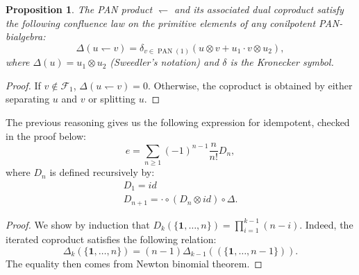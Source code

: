 \documentclass[11pt,leqno]{amsart}
\theoremstyle{definition}
\theoremstyle{plain}
\newtheorem{proposition}[definition]{Proposition}
\begin{document}
\begin{proposition}
The PAN product $\leftharpoondown$ and its associated dual coproduct satisfy the following confluence law on the primitive elements of any conilpotent PAN-bialgebra:
\begin{equation} \label{comprelPAN}
\Delta (u \leftharpoondown v) = \delta_{v \in \operatorname{PAN}(1)} \left(u \otimes v + u_1 \cdot v \otimes u_2 \right), 
\end{equation}
where $\Delta(u) = u_1 \otimes u_2$ (Sweedler's notation) and $\delta$ is the Kronecker symbol.
\begin{figure}[h!]
\end{figure}
\end{proposition}

\begin{proof} If $v \notin \mathcal{F}_1$, $\Delta (u \leftharpoondown v)=0$. Otherwise, the coproduct is obtained by either separating $u$ and $v$ or splitting $u$.
\end{proof}

The previous reasoning gives us the following expression for idempotent, checked in the proof below:
\begin{equation*}
e= \sum_{n \geq 1} (-1)^{n-1} \frac{n}{n!} D_n,
\end{equation*} 
where $D_n$ is defined recursively by:
\begin{align*} \label{defDn}
D_{1}=id  \\
D_{n+1} = \cdot \circ (D_n \otimes id) \circ \Delta.
\end{align*}

\begin{proof}
 We show by induction that $D_k(\{\mathbf{1}, \ldots, n\}) = \prod_{i=1}^{k-1} (n-i) $. Indeed, the iterated coproduct satisfies the following relation:
\begin{equation}
\Delta_k (\{\mathbf{1}, \ldots, n\}) = (n-1) \Delta_{k-1}((\{\mathbf{1}, \ldots, n-1\})).
\end{equation}
The equality then comes from Newton binomial theorem.
\end{proof}
\end{document}
